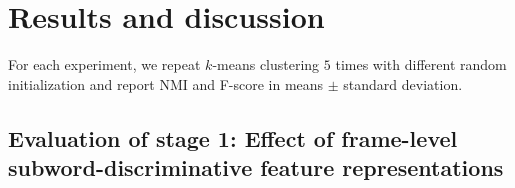 \documentclass[a4paper]{article}
\newcommand{\cmark}{\ding{51}}%
\newcommand{\xmark}{\ding{55}}%
\begin{document}
 

\section{Results and discussion}
\label{sec:results}
For each experiment, we repeat $k$-means clustering $5$ times with different  random initialization and report NMI and F-score  in means $\pm$ standard deviation.

\subsection{Evaluation of stage 1: Effect of frame-level subword-discriminative feature representations}
\label{subsec:multi_mono_asr}
\begin{table}[!t]
\renewcommand\arraystretch{0.4}
\centering
\caption{Comparison of adopting a multi-/monolingual OOD ASR system  in stage 1 of our approach  and SotA \cite{Ondel2019Bayesian,Yusuf2020hierarchical}.}
\label{tab:results_mono_multi}
\end{table}
\end{document}
